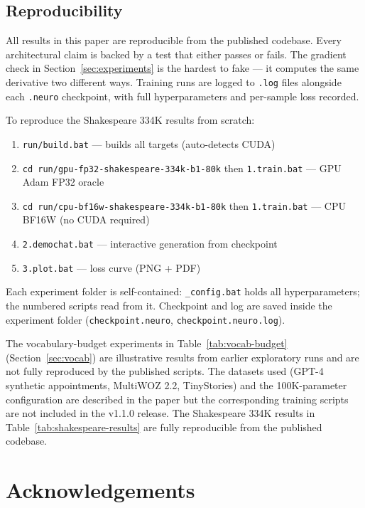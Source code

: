 \documentclass[11pt]{article}
\newcommand{\repoversion}{v1.1.0}
\begin{document}
\subsection{Reproducibility}

All results in this paper are reproducible from the published codebase.
Every architectural claim is backed by a test that either passes or fails.
The gradient check in Section~\ref{sec:experiments} is the hardest to fake ---
it computes the same derivative two different ways. Training runs are logged
to \texttt{.log} files alongside each \texttt{.neuro} checkpoint, with full
hyperparameters and per-sample loss recorded.

To reproduce the Shakespeare 334K results from scratch:
\begin{enumerate}
  \item \texttt{run/build.bat} --- builds all targets (auto-detects CUDA)
  \item \texttt{cd run/gpu-fp32-shakespeare-334k-b1-80k} then \texttt{1.train.bat} --- GPU Adam FP32 oracle
  \item \texttt{cd run/cpu-bf16w-shakespeare-334k-b1-80k} then \texttt{1.train.bat} --- CPU BF16W (no CUDA required)
  \item \texttt{2.demochat.bat} --- interactive generation from checkpoint
  \item \texttt{3.plot.bat} --- loss curve (PNG + PDF)
\end{enumerate}

Each experiment folder is self-contained: \texttt{\_{}config.bat} holds all
hyperparameters; the numbered scripts read from it. Checkpoint and log are
saved inside the experiment folder (\texttt{checkpoint.neuro},
\texttt{checkpoint.neuro.log}).

The vocabulary-budget experiments in Table~\ref{tab:vocab-budget} (Section~\ref{sec:vocab})
are illustrative results from earlier exploratory runs and are not fully reproduced by the
published scripts. The datasets used (GPT-4 synthetic appointments, MultiWOZ 2.2,
TinyStories) and the 100K-parameter configuration are described in the paper
but the corresponding training scripts are not included in the \repoversion{} release.
The Shakespeare 334K results in Table~\ref{tab:shakespeare-results} are fully reproducible
from the published codebase.

\section*{Acknowledgements}
\end{document}
